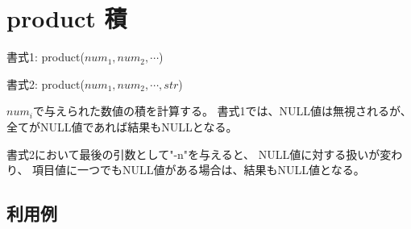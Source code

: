 
%

\section{product 積\label{sect:product}}

書式1: product($num_1,num_2,\cdots$)

書式2: product($num_1,num_2,\cdots,str$)

$num_i$で与えられた数値の積を計算する。
書式1では、NULL値は無視されるが、全てがNULL値であれば結果もNULLとなる。

書式2において最後の引数として"-n"を与えると、
NULL値に対する扱いが変わり、
項目値に一つでもNULL値がある場合は、結果もNULL値となる。

\subsection*{利用例}


%

